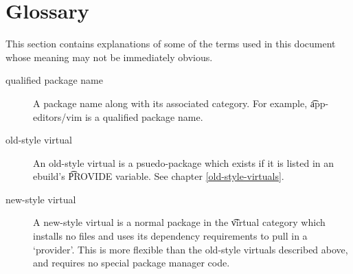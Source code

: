 \chapter{Glossary}
\label{glossary}

This section contains explanations of some of the terms used in this document whose meaning may not
be immediately obvious.

\begin{description}
\item[qualified package name] A package name along with its associated category. For example,
    \t{app-editors/vim} is a qualified package name.
\item[old-style virtual] An old-style virtual is a psuedo-package which exists if it is listed in an
    ebuild's \t{PROVIDE} variable. See chapter \ref{old-style-virtuals}.
\item[new-style virtual] A new-style virtual is a normal package in the \t{virtual} category which
    installs no files and uses its dependency requirements to pull in a `provider'. This is more
    flexible than the old-style virtuals described above, and requires no special package manager
    code.

\end{description}


